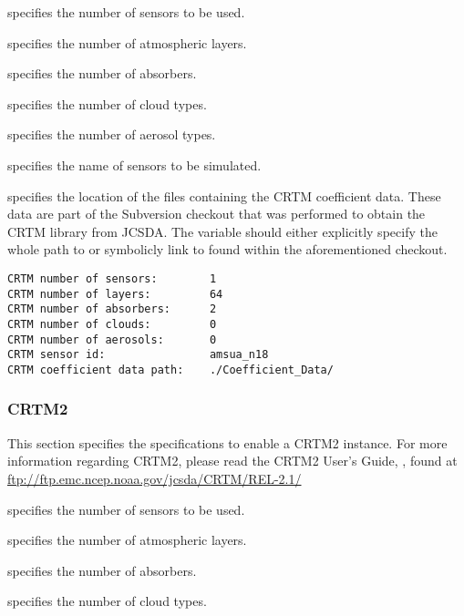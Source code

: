   specifies the number of sensors
 to be used.

  specifies the number of atmospheric
 layers.

  specifies the number of absorbers.

  specifies the number of cloud types.

  specifies the number of aerosol types.

  specifies the name of sensors to be simulated.

  specifies the location of the files
 containing the CRTM coefficient data.  These data are part of the
 Subversion checkout that was performed to obtain the CRTM library
 from JCSDA.  The  variable should
 either explicitly specify the whole path to or symbolicly link to 
  found within the
 aforementioned checkout. 
 

 \begin{Verbatim}[frame=single]
CRTM number of sensors:        1
CRTM number of layers:         64
CRTM number of absorbers:      2
CRTM number of clouds:         0 
CRTM number of aerosols:       0 
CRTM sensor id:                amsua_n18  
CRTM coefficient data path:    ./Coefficient_Data/
 \end{Verbatim}
 

 
 \subsubsection{CRTM2} \label{ssec:crtm2}
 This section specifies the specifications to enable a CRTM2 instance.
 For more information regarding CRTM2, please read the CRTM2 User's
 Guide, , found at \\
 \hyperref{ftp://ftp.emc.ncep.noaa.gov/jcsda/CRTM/REL-2.1/}{}{}{ftp://ftp.emc.ncep.noaa.gov/jcsda/CRTM/REL-2.1/}

  specifies the number of sensors
 to be used.

  specifies the number of atmospheric
 layers.

  specifies the number of absorbers.

  specifies the number of cloud types.

